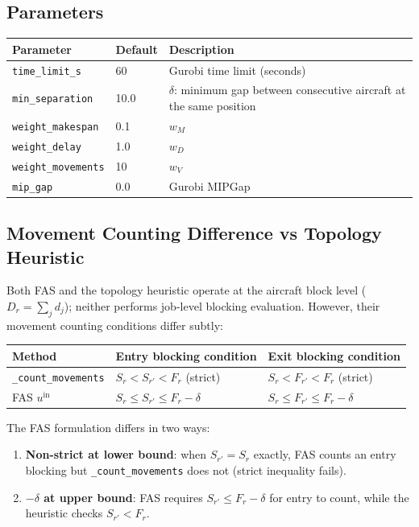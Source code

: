 \subsection{Parameters}

\begin{center}
\begin{tabular}{lll}
\toprule
Parameter & Default & Description \\
\midrule
\texttt{time\_limit\_s}    & 60   & Gurobi time limit (seconds) \\
\texttt{min\_separation}   & 10.0 & $\delta$: minimum gap between consecutive
                                    aircraft at the same position \\
\texttt{weight\_makespan}  & 0.1  & $w_M$ \\
\texttt{weight\_delay}     & 1.0  & $w_D$ \\
\texttt{weight\_movements} & 10   & $w_V$ \\
\texttt{mip\_gap}          & 0.0  & Gurobi MIPGap \\
\bottomrule
\end{tabular}
\end{center}

\subsection{Movement Counting Difference vs Topology Heuristic}
\label{sec:fas-modelling-diff}

Both FAS and the topology heuristic operate at the aircraft block level
($D_r = \sum_j d_j$); neither performs job-level blocking evaluation.
However, their movement counting conditions differ subtly:

\begin{center}
\begin{tabular}{lll}
\toprule
Method & Entry blocking condition & Exit blocking condition \\
\midrule
\texttt{\_count\_movements} & $S_r < S_{r'} < F_r$ (strict) &
    $S_r < F_{r'} < F_r$ (strict) \\
FAS $u^{\mathrm{in}}$ & $S_r \leq S_{r'} \leq F_r - \delta$ &
    $S_r \leq F_{r'} \leq F_r - \delta$ \\
\bottomrule
\end{tabular}
\end{center}

The FAS formulation differs in two ways:
\begin{enumerate}[noitemsep]
    \item \textbf{Non-strict at lower bound}: when $S_{r'} = S_r$ exactly,
          FAS counts an entry blocking but \texttt{\_count\_movements} does not
          (strict inequality fails).
    \item \textbf{$-\delta$ at upper bound}: FAS requires $S_{r'} \leq F_r -
          \delta$ for entry to count, while the heuristic checks $S_{r'} <
          F_r$.
\end{enumerate}

